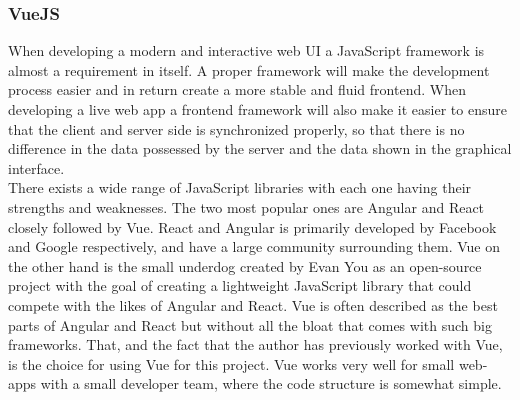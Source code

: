 \documentclass{article}
\begin{document}
\subsubsection{VueJS}
When developing a modern and interactive web UI a JavaScript framework is almost a requirement in itself. A proper framework will make the development process easier and in return create a more stable and fluid frontend. When developing a live web app a frontend framework will also make it easier to ensure that the client and server side is synchronized properly, so that there is no difference in the data possessed by the server and the data shown in the graphical interface.
\\
There exists a wide range of JavaScript libraries with each one having their strengths and weaknesses. The two most popular ones are Angular and React closely followed by Vue\cite{url:implementation:javascript-frameworks}. React and Angular is primarily developed by Facebook and Google respectively, and have a large community surrounding them. Vue on the other hand is the small underdog created by Evan You as an open-source project with the goal of creating a lightweight JavaScript library that could compete with the likes of Angular and React. Vue is often described as the best parts of Angular and React but without all the bloat that comes with such big frameworks. That, and the fact that the author has previously worked with Vue, is the choice for using Vue for this project. Vue works very well for small web-apps with a small developer team, where the code structure is somewhat simple.

\end{document}
